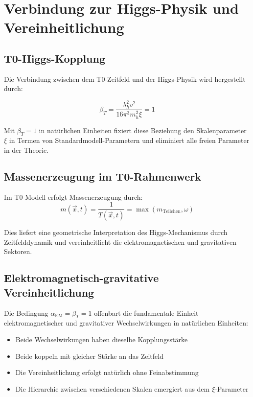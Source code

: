 \documentclass[12pt,a4paper]{article}
\newcommand{\Tfieldt}{T(\vec{x},t)}
\begin{document}
\section{Verbindung zur Higgs-Physik und Vereinheitlichung}
\label{sec:higgs_verbindung}

\subsection{T0-Higgs-Kopplung}
\label{subsec:t0_higgs_kopplung}

Die Verbindung zwischen dem T0-Zeitfeld und der Higgs-Physik wird hergestellt durch:

\begin{equation}
	\beta_T = \frac{\lambda_h^2 v^2}{16\pi^3 m_h^2 \xi} = 1
	\label{eq:higgs_verbindung}
\end{equation}

Mit $\beta_T = 1$ in natürlichen Einheiten fixiert diese Beziehung den Skalenparameter $\xi$ in Termen von Standardmodell-Parametern und eliminiert alle freien Parameter in der Theorie.

\subsection{Massenerzeugung im T0-Rahmenwerk}
\label{subsec:massenerzeugung_t0}

Im T0-Modell erfolgt Massenerzeugung durch:
\begin{equation}
	m(\vec{x},t) = \frac{1}{\Tfieldt} = \max(m_{\text{Teilchen}}, \omega)
	\label{eq:t0_massenerzeugung}
\end{equation}

Dies liefert eine geometrische Interpretation des Higgs-Mechanismus durch Zeitfelddynamik und vereinheitlicht die elektromagnetischen und gravitativen Sektoren.

\subsection{Elektromagnetisch-gravitative Vereinheitlichung}
\label{subsec:em_grav_vereinheitlichung}

Die Bedingung $\alpha_{\text{EM}} = \beta_T = 1$ offenbart die fundamentale Einheit elektromagnetischer und gravitativer Wechselwirkungen in natürlichen Einheiten:

\begin{itemize}
	\item Beide Wechselwirkungen haben dieselbe Kopplungsstärke
	\item Beide koppeln mit gleicher Stärke an das Zeitfeld
	\item Die Vereinheitlichung erfolgt natürlich ohne Feinabstimmung
	\item Die Hierarchie zwischen verschiedenen Skalen emergiert aus dem $\xi$-Parameter
\end{itemize}
\end{document}
